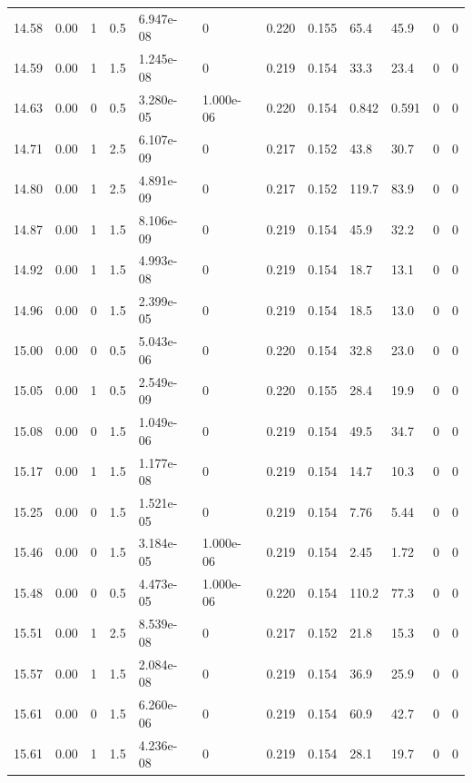 \documentclass[preview]{standalone}
\begin{document}
{{{{{{{\begin{tabular}{L{1.2cm}C{1.2cm} C{0.3cm}C{0.5cm} C{1.4cm}C{1.4cm} C{1.4cm}C{1.4cm} C{1.6cm}C{1.6cm} C{1.6cm}C{1.6cm}}
  14.58  &  0.00  & 1     & 0.5 &  6.947e-08  & 0  &  0.220&   0.155& 65.4 & 45.9   &  0 & 0  \\ 
  14.59  &  0.00  & 1     & 1.5 &  1.245e-08  & 0  &  0.219&   0.154& 33.3 & 23.4   &  0 & 0  \\ 
  14.63  &  0.00  & 0     & 0.5 &  3.280e-05  & 1.000e-06  &  0.220&   0.154& 0.842 & 0.591   &  0 & 0  \\ 
  14.71  &  0.00  & 1     & 2.5 &  6.107e-09  & 0  &  0.217&   0.152& 43.8 & 30.7   &  0 & 0  \\ 
  14.80  &  0.00  & 1     & 2.5 &  4.891e-09  & 0  &  0.217&   0.152& 119.7 & 83.9   &  0 & 0  \\ 
  14.87  &  0.00  & 1     & 1.5 &  8.106e-09  & 0  &  0.219&   0.154& 45.9 & 32.2   &  0 & 0  \\ 
  14.92  &  0.00  & 1     & 1.5 &  4.993e-08  & 0  &  0.219&   0.154& 18.7 & 13.1   &  0 & 0  \\ 
  14.96  &  0.00  & 0     & 1.5 &  2.399e-05  & 0  &  0.219&   0.154& 18.5 & 13.0   &  0 & 0  \\ 
  15.00  &  0.00  & 0     & 0.5 &  5.043e-06  & 0  &  0.220&   0.154& 32.8 & 23.0   &  0 & 0  \\ 
  15.05  &  0.00  & 1     & 0.5 &  2.549e-09  & 0  &  0.220&   0.155& 28.4 & 19.9   &  0 & 0  \\ 
  15.08  &  0.00  & 0     & 1.5 &  1.049e-06  & 0  &  0.219&   0.154& 49.5 & 34.7   &  0 & 0  \\ 
  15.17  &  0.00  & 1     & 1.5 &  1.177e-08  & 0  &  0.219&   0.154& 14.7 & 10.3   &  0 & 0  \\ 
  15.25  &  0.00  & 0     & 1.5 &  1.521e-05  & 0  &  0.219&   0.154& 7.76 & 5.44   &  0 & 0  \\ 
  15.46  &  0.00  & 0     & 1.5 &  3.184e-05  & 1.000e-06  &  0.219&   0.154& 2.45 & 1.72   &  0 & 0  \\ 
  15.48  &  0.00  & 0     & 0.5 &  4.473e-05  & 1.000e-06  &  0.220&   0.154& 110.2 & 77.3   &  0 & 0  \\ 
  15.51  &  0.00  & 1     & 2.5 &  8.539e-08  & 0  &  0.217&   0.152& 21.8 & 15.3   &  0 & 0  \\ 
  15.57  &  0.00  & 1     & 1.5 &  2.084e-08  & 0  &  0.219&   0.154& 36.9 & 25.9   &  0 & 0  \\ 
  15.61  &  0.00  & 0     & 1.5 &  6.260e-06  & 0  &  0.219&   0.154& 60.9 & 42.7   &  0 & 0  \\ 
  15.61  &  0.00  & 1     & 1.5 &  4.236e-08  & 0  &  0.219&   0.154& 28.1 & 19.7   &  0 & 0  \\ 

\end{tabular}}}}}}}}
\end{document}
